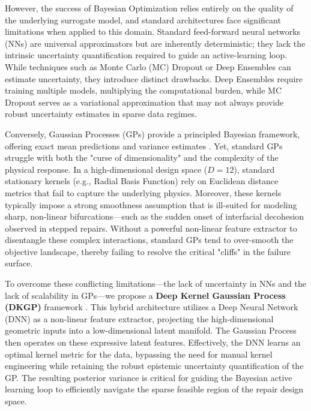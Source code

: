 \documentclass[
  preprint,
  12pt,
  a4paper
]{elsarticle}
\newcommand{\new}[1]{#1}
\begin{document}
However, the success of Bayesian Optimization relies entirely on the quality of the underlying surrogate model, and standard architectures face significant limitations when applied to this domain. Standard \new{feed-forward neural networks} (NNs) are universal approximators but are inherently deterministic; they lack the intrinsic uncertainty quantification required to guide an \new{active-learning loop}. While techniques such as Monte Carlo (MC) Dropout \cite{gal2016dropout} or Deep Ensembles \cite{lakshminarayanan2017simple} can estimate uncertainty, they introduce distinct drawbacks. Deep Ensembles require training multiple models, multiplying the computational burden, while MC Dropout serves as a variational approximation that may not always provide robust uncertainty estimates in sparse data regimes.


Conversely, Gaussian Processes (GPs) provide a principled Bayesian framework, offering exact mean predictions and variance estimates \cite{rasmussen2006gaussian}. Yet, standard GPs struggle with both the "curse of dimensionality" and the complexity of the physical response. In a high-dimensional design space ($D=12$), standard stationary kernels (e.g., Radial Basis Function) rely on Euclidean distance metrics that fail to capture the underlying physics. Moreover, these kernels typically \new{impose a strong smoothness assumption that} is ill-suited for modeling sharp, non-linear bifurcations—such as the sudden onset of interfacial decohesion observed in stepped repairs. Without a powerful non-linear feature extractor to disentangle these complex interactions, standard GPs tend to over-smooth the objective landscape, thereby failing to resolve the critical "cliffs" in the failure surface.

To overcome these conflicting limitations—the lack of uncertainty in NNs and the lack of scalability in GPs—we propose a \textbf{Deep Kernel Gaussian Process (DKGP)} framework \cite{wilson2016deep}. This hybrid architecture utilizes a \new{Deep Neural Network (DNN)} as a non-linear feature extractor, projecting the high-dimensional geometric inputs into a low-dimensional latent manifold. The Gaussian Process then operates on these expressive latent features. Effectively, the \new{DNN} learns an optimal kernel metric for the data, bypassing the need for manual kernel engineering while retaining the robust epistemic uncertainty quantification of the GP. \new{The resulting posterior variance} is critical for guiding the \new{Bayesian active learning loop} to efficiently navigate the sparse feasible region of the repair design space.
\end{document}
